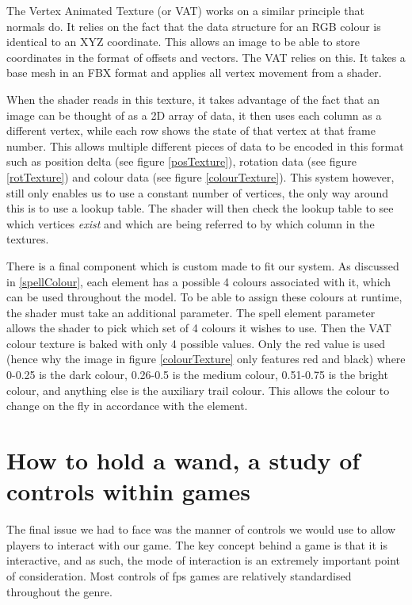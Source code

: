 \documentclass[12pt,a4paper]{report}
\begin{document}
The Vertex Animated Texture (or VAT) works on a similar principle that normals do. It relies on the fact that the data structure for an RGB colour is identical to an XYZ coordinate. This allows an image to be able to store coordinates in the format of offsets and vectors. The VAT relies on this. It takes a base mesh in an FBX format and applies all vertex movement from a shader.

When the shader reads in this texture, it takes advantage of the fact that an image can be thought of as a 2D array of data, it then uses each column as a different vertex, while each row shows the state of that vertex at that frame number. This allows multiple different pieces of data to be encoded in this format such as position delta (see figure \ref{posTexture}), rotation data (see figure \ref{rotTexture}) and colour data (see figure \ref{colourTexture}). This system however, still only enables us to use a constant number of vertices, the only way around this is to use a lookup table. The shader will then check the lookup table to see which vertices \textit{exist} and which are being referred to by which column in the textures.

There is a final component which is custom made to fit our system. As discussed in \ref{spellColour}, each element has a possible 4 colours associated with it, which can be used throughout the model. To be able to assign these colours at runtime, the shader must take an additional parameter. The spell element parameter allows the shader to pick which set of 4 colours it wishes to use. Then the VAT colour texture is baked with only 4 possible values. Only the red value is used (hence why the image in figure \ref{colourTexture} only features red and black) where 0-0.25 is the dark colour, 0.26-0.5 is the medium colour, 0.51-0.75 is the bright colour, and anything else is the auxiliary trail colour. This allows the colour to change on the fly in accordance with the element.

\chapter{How to hold a wand, a study of controls within games} \label{chapter3}

The final issue we had to face was the manner of controls we would use to allow players to interact with our game. The key concept behind a game is that it is interactive, and as such, the mode of interaction is an extremely important point of consideration. Most controls of \gls{fps} games are relatively standardised throughout the genre.
\end{document}
